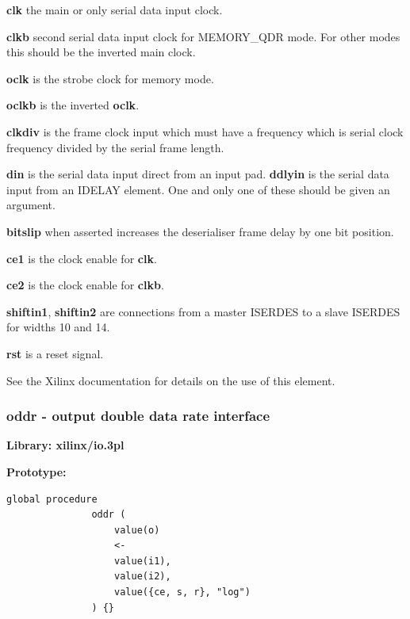             {\bf clk} the main or only serial data input clock.
            
            {\bf clkb} second serial data input clock for MEMORY\_QDR mode. For
            other modes this should be the inverted main clock.
            
            {\bf oclk} is the strobe clock for memory mode.
            
            {\bf oclkb} is the inverted {\bf oclk}.
            
            {\bf clkdiv} is the frame clock input which must have a frequency
            which is serial clock frequency divided by the serial frame
            length.
            
            {\bf din} is the serial data input direct from an input pad. {\bf
            ddlyin} is the serial data input from an IDELAY element. One and
            only one of these should be given an argument.
            
            {\bf bitslip} when asserted increases the deserialiser frame
            delay by one bit position.
            
            {\bf ce1} is the clock enable for {\bf clk}.
            
            {\bf ce2} is the clock enable for {\bf clkb}.
            
            {\bf shiftin1}, {\bf shiftin2} are connections from a
            master ISERDES to a slave ISERDES for widths 10 and 14.
            
            {\bf rst} is a reset signal.
            
            See the Xilinx documentation for details on the use of this
            element.





        \subsubsection{oddr - output double data rate interface}\label{sec:lpoddr}

            {\bf Library: xilinx/io.3pl}

            {\bf Prototype:} \\
            \vsp
            \begin{lstlisting}[gobble=12, language=threepl]
               global procedure
               oddr (
                   value(o)
                   <-
                   value(i1),
                   value(i2),
                   value({ce, s, r}, "log")
               ) {}
            \end{lstlisting}

